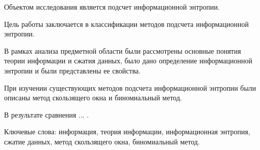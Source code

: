 \begin{essay}{}

Объектом исследования является подсчет информационной энтропии.

Цель работы заключается в классификации методов подсчета информационной энтропии.

В рамках анализа предметной области были рассмотрены основные понятия теории информации и сжатия данных, было дано определение информационной энтропии и были представлены ее свойства.

При изучении существующих методов подсчета информационной энтропии были описаны метод скользящего окна и биномиальный метод.

В результате сравнения ... .

Ключевые слова: информация, теория информации, информационная энтропия, сжатие данных, метод скользящего окна, биномиальный метод.

\end{essay}